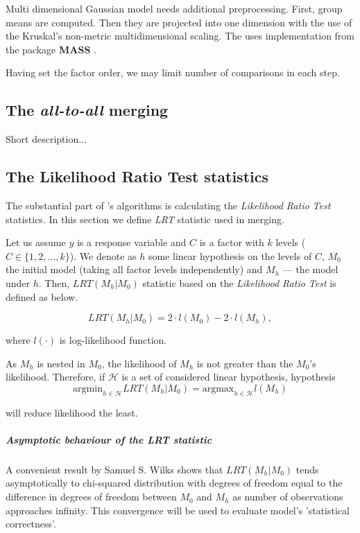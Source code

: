 Multi dimensional Gaussian model needs additional preprocessing. First, group means are computed. Then they are projected into one dimension with the use of the Kruskal's non-metric multidimensional scaling. The \factorMerger uses  implementation from the package \textbf{MASS} \citep{MASS}. 

Having set the factor order, we may limit number of comparisons in each step.


\subsection{The \emph{all-to-all} merging}

Short description...

\subsection{The Likelihood Ratio Test statistics}

The substantial part of \factorMergerTitle 's algorithms is calculating the \emph{Likelihood Ratio Test} statistics. In this section we define \emph{LRT} statistic used in merging.

Let us assume $y$ is a response variable and $C$ is a factor with $k$ levels ($C \in \{1, 2, ..., k \}$). We denote as $h$ some linear hypothesis on the levels of $C$, $M_0$ the initial model (taking all factor levels independently) and $M_h$ --- the model under $h$. Then, $LRT(M_h|M_0)$ statistic based on the \emph{Likelihood Ratio Test} is defined as below.

$$ 
LRT(M_h|M_0) = 2 \cdot l (M_0) - 2 \cdot l (M_h), 
$$

where $l(\cdot)$ is log-likelihood function.

As $M_h$ is nested in $M_0$, the likelihood of $M_h$ is not greater than the $M_0$'s likelihood. Therefore, if $\mathcal{H}$ is a set of considered linear hypothesis, hypothesis 
$$
\mathrm{argmin}_{h \in \mathcal{H}} LRT(M_h|M_0) = \mathrm{argmax}_{h \in \mathcal{H}} l(M_h)
$$

will reduce likelihood the least.

\subparagraph{Asymptotic behaviour of the \emph{LRT} statistic} 

A convenient result by Samuel S. Wilks \citep{wilks1938large} shows that $LRT(M_h|M_0)$ tends asymptotically to chi-squared distribution with degrees of freedom equal to the difference in degrees of freedom between $M_0$ and $M_h$ as number of observations approaches infinity. This convergence will be used to evaluate model's 'statistical correctness'.




